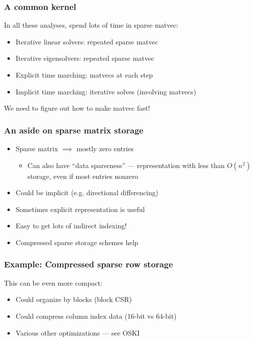 \documentclass{beamer}
\begin{document}
\begin{frame}
  \frametitle{A common kernel}

  In all these analyses, spend lots of time in sparse matvec:
  \begin{itemize}
  \item Iterative linear solvers: repeated sparse matvec
  \item Iterative eigensolvers: repeated sparse matvec
  \item Explicit time marching: matvecs at each step
  \item Implicit time marching: iterative solves (involving matvecs)
  \end{itemize}
  We need to figure out how to make matvec fast!

\end{frame}

\begin{frame}
  \frametitle{An aside on sparse matrix storage}

  \begin{itemize}
  \item Sparse matrix $\implies$ mostly zero entries
    \begin{itemize}
    \item Can also have ``data sparseness'' --- representation with 
      less than $O(n^2)$ storage, even if most entries nonzero
    \end{itemize}
  \item Could be implicit (e.g. directional differencing)
  \item Sometimes explicit representation is useful
  \item Easy to get lots of indirect indexing!
  \item Compressed sparse storage schemes help
  \end{itemize}
\end{frame}


\begin{frame}
  \frametitle{Example: Compressed sparse row storage}

  \begin{center}
    
  \end{center}
  
  This can be even more compact:
  \begin{itemize}
  \item Could organize by blocks (block CSR)
  \item Could compress column index data (16-bit vs 64-bit)
  \item Various other optimizations --- see OSKI
  \end{itemize}
\end{frame}
\end{document}
